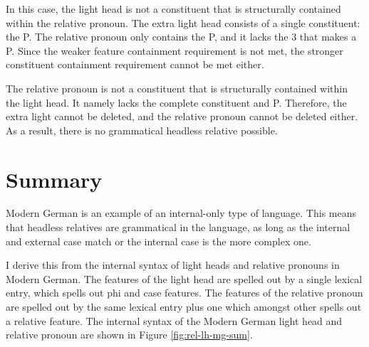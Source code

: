 In this case, the light head is not a constituent that is structurally contained within the relative pronoun.
The extra light head consists of a single constituent: the P.
The relative pronoun only contains the P, and it lacks the 3 that makes a P. Since the weaker feature containment requirement is not met, the stronger constituent containment requirement cannot be met either.

The relative pronoun is not a constituent that is structurally contained within the light head. It namely lacks the complete constituent and P.
Therefore, the extra light cannot be deleted, and the relative pronoun cannot be deleted either.
As a result, there is no grammatical headless relative possible.

\section{Summary}

Modern German is an example of an internal-only type of language. This means that headless relatives are grammatical in the language, as long as the internal and external case match or the internal case is the more complex one.

I derive this from the internal syntax of light heads and relative pronouns in Modern German. The features of the light head are spelled out by a single lexical entry, which spells out phi and case features. The features of the relative pronoun are spelled out by the same lexical entry plus one which amongst other spells out a relative feature. The internal syntax of the Modern German light head and relative pronoun are shown in Figure \ref{fig:rel-lh-mg-sum}.

